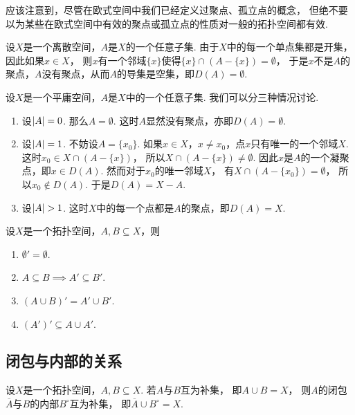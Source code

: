 应该注意到，尽管在欧式空间中我们已经定义过聚点、孤立点的概念，
但绝不要以为某些在欧式空间中有效的聚点或孤立点的性质对一般的拓扑空间都有效.

\begin{example}[离散空间中的聚点]\label{example:拓扑学.离散空间中的聚点}
设\(X\)是一个离散空间，\(A\)是\(X\)的一个任意子集.
由于\(X\)中的每一个单点集都是开集，因此如果\(x \in X\)，
则\(x\)有一个邻域\(\{x\}\)使得\(\{x\}\cap(A-\{x\})=\emptyset\)，
于是\(x\)不是\(A\)的聚点，\(A\)没有聚点，从而\(A\)的导集是空集，即\(D(A)=\emptyset\).
\end{example}

\begin{example}[平庸空间中的聚点]\label{example:拓扑学.平庸空间中的聚点}
设\(X\)是一个平庸空间，\(A\)是\(X\)中的一个任意子集.
我们可以分三种情况讨论.
\begin{enumerate}
	\item 设\(\abs{A} = 0\).
	那么\(A = \emptyset\).
	这时\(A\)显然没有聚点，亦即\(D(A) = \emptyset\).

	\item 设\(\abs{A} = 1\).
	不妨设\(A = \{x_0\}\).
	如果\(x \in X\)，\(x \neq x_0\)，点\(x\)只有唯一的一个邻域\(X\).
	这时\(x_0 \in X \cap (A - \{x\})\)，
	所以\(X \cap (A - \{x\}) \neq \emptyset\).
	因此\(x\)是\(A\)的一个凝聚点，即\(x \in D(A)\).
	然而对于\(x_0\)的唯一邻域\(X\)，
	有\(X \cap (A - \{x_0\}) = \emptyset\)，
	所以\(x_0 \notin D(A)\).
	于是\(D(A) = X - A\).

	\item 设\(\abs{A} > 1\).
	这时\(X\)中的每一个点都是\(A\)的聚点，即\(D(A) = X\).
\end{enumerate}
\end{example}

\begin{theorem}
设\(X\)是一个拓扑空间，\(A,B \subseteq X\)，则
\begin{enumerate}
	\item \(\emptyset' = \emptyset\).
	\item \(A \subseteq B \implies A' \subseteq B'\).
	\item \((A \cup B)' = A' \cup B'\).
	\item \((A')' \subseteq A \cup A'\).
\end{enumerate}
\end{theorem}

\subsection{闭包与内部的关系}
\begin{theorem}
设\(X\)是一个拓扑空间，\(A,B \subseteq X\).
若\(A\)与\(B\)互为补集，
即\(A \cup B = X\)，
则\(A\)的闭包\(\overline{A}\)与\(B\)的内部\(B^\circ\)互为补集，
即\(\overline{A} \cup B^\circ = X\).
\end{theorem}

